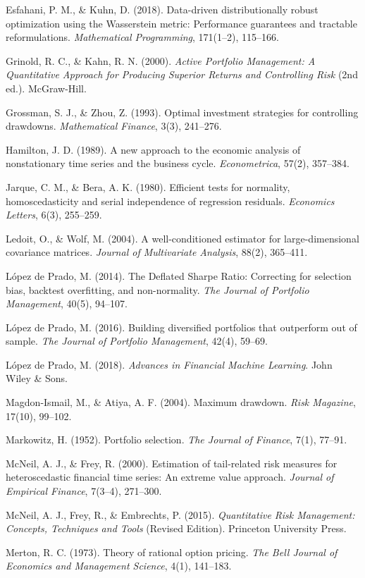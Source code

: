 \documentclass[11pt,a4paper]{article}
\begin{document}
Esfahani, P. M., \& Kuhn, D. (2018). Data-driven distributionally robust optimization using the Wasserstein metric: Performance guarantees and tractable reformulations. \textit{Mathematical Programming}, 171(1--2), 115--166.

Grinold, R. C., \& Kahn, R. N. (2000). \textit{Active Portfolio Management: A Quantitative Approach for Producing Superior Returns and Controlling Risk} (2nd ed.). McGraw-Hill.

Grossman, S. J., \& Zhou, Z. (1993). Optimal investment strategies for controlling drawdowns. \textit{Mathematical Finance}, 3(3), 241--276.

Hamilton, J. D. (1989). A new approach to the economic analysis of nonstationary time series and the business cycle. \textit{Econometrica}, 57(2), 357--384.

Jarque, C. M., \& Bera, A. K. (1980). Efficient tests for normality, homoscedasticity and serial independence of regression residuals. \textit{Economics Letters}, 6(3), 255--259.

Ledoit, O., \& Wolf, M. (2004). A well-conditioned estimator for large-dimensional covariance matrices. \textit{Journal of Multivariate Analysis}, 88(2), 365--411.

López de Prado, M. (2014). The Deflated Sharpe Ratio: Correcting for selection bias, backtest overfitting, and non-normality. \textit{The Journal of Portfolio Management}, 40(5), 94--107.

López de Prado, M. (2016). Building diversified portfolios that outperform out of sample. \textit{The Journal of Portfolio Management}, 42(4), 59--69.

López de Prado, M. (2018). \textit{Advances in Financial Machine Learning}. John Wiley \& Sons.

Magdon-Ismail, M., \& Atiya, A. F. (2004). Maximum drawdown. \textit{Risk Magazine}, 17(10), 99--102.

Markowitz, H. (1952). Portfolio selection. \textit{The Journal of Finance}, 7(1), 77--91.

McNeil, A. J., \& Frey, R. (2000). Estimation of tail-related risk measures for heteroscedastic financial time series: An extreme value approach. \textit{Journal of Empirical Finance}, 7(3--4), 271--300.

McNeil, A. J., Frey, R., \& Embrechts, P. (2015). \textit{Quantitative Risk Management: Concepts, Techniques and Tools} (Revised Edition). Princeton University Press.

Merton, R. C. (1973). Theory of rational option pricing. \textit{The Bell Journal of Economics and Management Science}, 4(1), 141--183.
\end{document}
